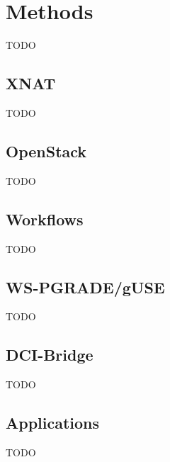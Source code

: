 \section{Methods}\label{methods}

TODO

\subsection{XNAT}\label{xnat}

TODO

\subsection{OpenStack}\label{openstack}

TODO

\subsection{Workflows}\label{workflows}

TODO

\subsection{WS-PGRADE/gUSE}\label{guse}

TODO

\subsection{DCI-Bridge}\label{dci}

TODO

\subsection{Applications}\label{applications}

TODO